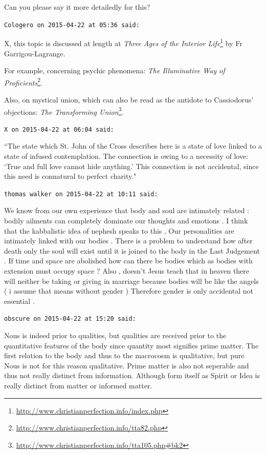 \begin{footnotesize}
\begin{sffamily}
Can you please say it more detailedly for this?


\hfill

\texttt{Cologero on 2015-04-22 at 05:36 said: }

X, this topic is discussed at length at \textit{Three Ages of the Interior Life}\footnote{\url{http://www.christianperfection.info/index.php}} by Fr Garrigou-Lagrange.

For example, concerning psychic phenomena: \textit{The Illuminative Way of Proficients}\footnote{\url{http://www.christianperfection.info/tta82.php}}.

Also, on mystical union, which can also be read as the antidote to Cassiodorus' objections: \textit{The Transforming Union}\footnote{\url{http://www.christianperfection.info/tta105.php\#bk2}}.


\hfill

\texttt{X on 2015-04-22 at 06:04 said: }

``The state which St. John of the Cross describes here is a state of love linked to a state of infused contemplation. The connection is owing to a necessity of love: `True and full love cannot hide anything.' This connection is not accidental, since this need is connatural to perfect charity."


\hfill

\texttt{thomas walker on 2015-04-22 at 10:11 said: }

We know from our own experience that body and soul are intimately related : bodily ailments can completely dominate our thoughts and emotions . I think that the kabbalistic idea of nephesh speaks to this , Our personalities are intimately linked with our bodies . There is a problem to understand how after death only the soul will exist until it is joined to the body in the Last Judgement . If time and space are abolished how can there be bodies which as bodies with extension must occupy space ?\newline
Also , doesn't Jesus teach that in heaven there will neither be taking or giving in marriage because bodies will be like the angels ( i assume that means without gender ) Therefore gender is only accidental not essential .


\hfill

\texttt{obscure on 2015-04-22 at 15:20 said: }

Nous is indeed prior to qualities, but qualities are received prior to the quantitative features of the body since quantity most signifies prime matter. The first relation to the body and thus to the macrocosm is qualitative, but pure Nous is not for this reason qualitative. Prime matter is also not seperable and thus not really distinct from information. Although form itself as Spirit or Idea is really distinct from matter or informed matter.


\end{sffamily}
\end{footnotesize}
